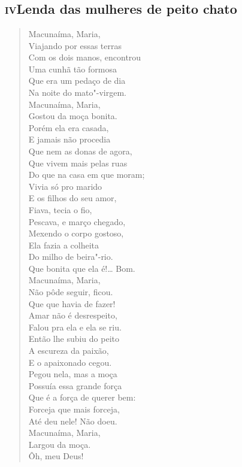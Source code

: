 \chapter*{}
\section*{\textsc{iv}\break Lenda das mulheres de peito chato}

\begin{verse}
Macunaíma, Maria,\\
Viajando por essas terras\\
Com os dois manos, encontrou\\
Uma cunhã tão formosa\\
Que era um pedaço de dia\\
Na noite do mato"-virgem.\\
Macunaíma, Maria,\\
Gostou da moça bonita.\\
Porém ela era casada,\\
E jamais não procedia\\
Que nem as donas de agora,\\
Que vivem mais pelas ruas\\
Do que na casa em que moram;\\
Vivia só pro marido\\
E os filhos do seu amor,\\
Fiava, tecia o fio,\\
Pescava, e março chegado,\\
Mexendo o corpo gostoso,\\
Ela fazia a colheita\\
Do milho de beira"-rio.\\
Que bonita que ela é!\ldots{} Bom.\\
Macunaíma, Maria,\\
Não pôde seguir, ficou.\\
Que que havia de fazer!\\
Amar não é desrespeito,\\
Falou pra ela e ela se riu.\\
Então lhe subiu do peito\\
A escureza da paixão,\\
E o apaixonado cegou.\\
Pegou nela, mas a moça\\
Possuía essa grande força\\
Que é a força de querer bem:\\
Forceja que mais forceja,\\
Até deu nele! Não doeu.\\
Macunaíma, Maria,\\
Largou da moça.\\
\qquad\qquad\qquad{}Ôh, meu Deus!


\end{verse}
